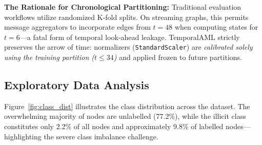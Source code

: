 \noindent \textbf{The Rationale for Chronological Partitioning:} Traditional evaluation workflows utilize randomized K-fold splits. On streaming graphs, this permits message aggregators to incorporate edges from $t = 48$ when computing states for $t = 6$—a fatal form of temporal look-ahead leakage. TemporalAML strictly preserves the arrow of time: normalizers (\texttt{StandardScaler}) are \textit{calibrated solely using the training partition ($t \leq 34$)} and applied frozen to future partitions.

\subsection{Exploratory Data Analysis}
\label{subsec:eda}

Figure~\ref{fig:class_dist} illustrates the class distribution across the dataset. The overwhelming majority of nodes are unlabelled (77.2\%), while the illicit class constitutes only 2.2\% of all nodes and approximately 9.8\% of labelled nodes—highlighting the severe class imbalance challenge.

